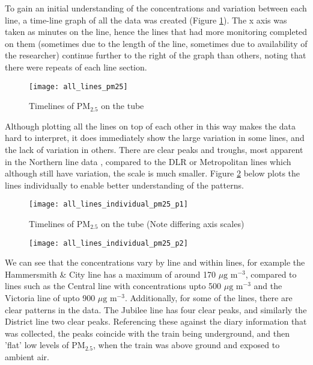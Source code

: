 To gain an initial understanding of the concentrations and variation between each line, a time-line graph of all the data was created (Figure \ref{fig:all_lines_pm25}). The x axis was taken as minutes on the line, hence the lines that had more monitoring completed on them (sometimes due to the length of the line, sometimes due to availability of the researcher) continue further to the right of the graph than others, noting that there were repeats of each line section.

\begin{figure}[H]
\centering
\texttt{[image: all\_lines\_pm25]}
\caption{Timelines of PM$_{2.5}$ on the tube}
\label{fig:all_lines_pm25}
\end{figure}

Although plotting all the lines on top of each other in this way makes the data hard to interpret, it does immediately show the large variation in some lines, and the lack of variation in others. There are clear peaks and troughs, most apparent in the Northern line data , compared to the DLR or Metropolitan lines which although still have variation, the scale is much smaller. Figure \ref{fig:all_lines_individual_pm25_p1} below plots the lines individually to enable better understanding of the patterns.

\begin{figure}[H]
\centering
\caption{Timelines of PM$_{2.5}$ on the tube (Note differing axis scales)}
\texttt{[image: all\_lines\_individual\_pm25\_p1]}
\label{fig:all_lines_individual_pm25_p1}
\end{figure}

\begin{figure}[H]
\centering
\texttt{[image: all\_lines\_individual\_pm25\_p2]}
\label{fig:all_lines_individual_pm25_p2}
\end{figure}

We can see that the concentrations vary by line and within lines, for example the Hammersmith \& City line has a maximum of around 170 $\mu \text{g m}^{-3}$, compared to lines such as the Central line with concentrations upto 500 $\mu \text{g m}^{-3}$ and the Victoria line of upto 900 $\mu \text{g m}^{-3}$. Additionally, for some of the lines, there are clear patterns in the data. The Jubilee line has four clear peaks, and similarly the District line two clear peaks. Referencing these against the diary information that was collected, the peaks coincide with the train being underground, and then 'flat' low levels of PM$_{2.5}$, when the train was above ground and exposed to ambient air.

